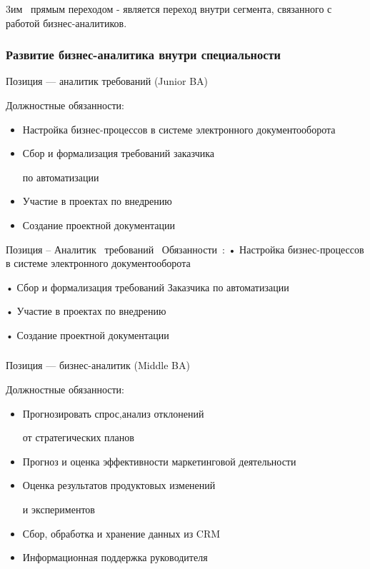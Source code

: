 \documentclass{../industrial-development}
\begin{document}
 3им~\cite{mc} прямым переходом  - является переход внутри сегмента, связанного с работой бизнес-аналитиков.

\begin{frame} \frametitle{Развитие бизнес-аналитика внутри специальности}
  \begin{block}{}
  \alert{Позиция --- аналитик требований (Junior  BA) }

Должностные обязанности: 
  \end{block}
  \begin{itemize}
  \item  Настройка бизнес-процессов в системе электронного документооборота 
  \item  Сбор и формализация требований заказчика 

по автоматизации
  \item Участие в проектах по внедрению 
 \item Создание проектной документации
  \end{itemize}
\end{frame}


\lecturenotes

Позиция – Аналитик~\cite{hh} требований~\cite{itcf}
Обязанности~\cite{rab}:
•	Настройка бизнес-процессов в системе электронного документооборота 

•	Сбор и формализация требований Заказчика по автоматизации 

•	Участие в проектах по внедрению 

•	Создание проектной документации


\begin{frame} \frametitle{}
  \begin{block}{}
  \alert{Позиция --- бизнес-аналитик (Middle  BA) }

Должностные обязанности: 
  \end{block}
  \begin{itemize}
  \item  Прогнозировать спрос,анализ отклонений 

от стратегических планов
  \item  Прогноз и оценка эффективности маркетинговой деятельности
  \item Оценка результатов продуктовых изменений 

и экспериментов
 \item  Сбор, обработка и хранение данных из CRM
 \item  Информационная поддержка руководителя
  \end{itemize}
\end{frame}
\end{document}
